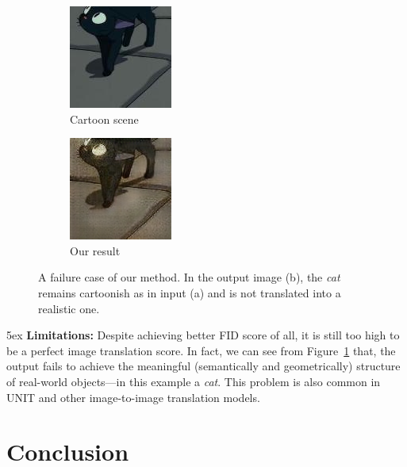 \documentclass[conference]{IEEEtran}
\begin{document}
\begin{figure}[!htb]
    \centering
    \begin{subfigure}[b]{0.2\textwidth}
        \centering
        \includegraphics[scale=0.7]{limitation/cat_real_A.png}
        \caption{Cartoon scene}
    \end{subfigure}
    \begin{subfigure}[b]{0.2\textwidth}
        \centering
        \includegraphics[scale=0.7]{limitation/cat_fake_B.png}
        \caption{Our result}
    \end{subfigure}
    \caption{
    A failure case of our method. In the output image (b), the \textit{cat} remains cartoonish as in input (a) and is not translated into a realistic one.}
    \label{fig:limitation}
\end{figure}

\parindent 5ex \textbf{Limitations:} Despite achieving better FID score of all, it is still too high to be a perfect image translation score. In fact, we can see from Figure~\ref{fig:limitation} that, the output fails to achieve the
meaningful (semantically and geometrically)
structure of real-world objects---in this example a \textit{cat}.
This problem is also common in UNIT\cite{DBLP:journals/corr/LiuBK17} and other image-to-image translation models.

\section{Conclusion}
\end{document}
